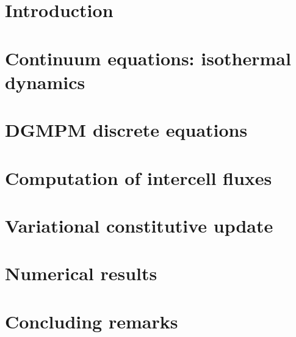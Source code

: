 \documentclass[final,3p,times]{elsarticle}
\begin{document}
\section{Introduction}
\label{sec:introduction}


\section{Continuum equations: isothermal dynamics}
\label{sec:continuum_problem}


\section{DGMPM discrete equations}
\label{sec:discretization}


\section{Computation of intercell fluxes}
\label{sec:riemann_solver}


\section{Variational constitutive update}
\label{sec:constitutive-update}


\section{Numerical results}
\label{sec:test_cases}



\section{Concluding remarks}
\label{sec:conclusion}




\end{document}
